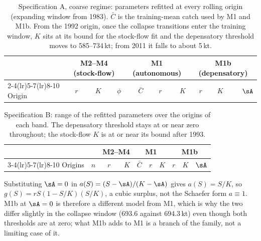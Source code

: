 \begin{table}[!htb]
\centering\scriptsize
\setlength{\tabcolsep}{4pt}
\caption{Specification A, coarse regime: parameters refitted at every rolling origin (expanding window from 1983). $\bar C$ is the training-mean catch used by M1 and M1b. From the 1992 origin, once the collapse transitions enter the training window, $K$ sits at its bound for the stock-flow fit and the depensatory threshold moves to 585--734\,kt; from 2011 it falls to about 5\,kt.}
\label{tab:si_rollingA}
\begin{tabular}{@{}lrrrrrrrrr@{}}
\toprule
 & \multicolumn{3}{c}{M2--M4 (stock-flow)} & \multicolumn{3}{c}{M1 (autonomous)} & \multicolumn{3}{c}{M1b (depensatory)} \\
\cmidrule(lr){2-4}\cmidrule(lr){5-7}\cmidrule(lr){8-10}
Origin & $r$ & $K$ & $\phi$ & $\bar C$ & $r$ & $K$ & $r$ & $K$ & $\sA$ \\
\midrule

\bottomrule
\end{tabular}
\end{table}

\begin{table}[!htb]
\centering\scriptsize
\setlength{\tabcolsep}{4pt}
\caption{Specification B: range of the refitted parameters over the origins of each band. The depensatory threshold stays at or near zero throughout; the stock-flow $K$ is at or near its bound after 1993.}
\label{tab:si_rollingB}
\begin{tabular}{@{}lrrrrrrrrr@{}}
\toprule
 & & \multicolumn{2}{c}{M2--M4} & \multicolumn{3}{c}{M1} & \multicolumn{3}{c}{M1b} \\
\cmidrule(lr){3-4}\cmidrule(lr){5-7}\cmidrule(lr){8-10}
Origins & $n$ & $r$ & $K$ & $\bar C$ & $r$ & $K$ & $r$ & $K$ & $\sA$ \\
\midrule

\bottomrule
\end{tabular}
\end{table}

\begin{remark}
Substituting $\sA = 0$ in $a(S) = (S-\sA)/(K-\sA)$ gives $a(S) = S/K$, so $g(S) = rS(1-S/K)(S/K)$, a cubic surplus, not the Schaefer form $a\equiv 1$. M1b at $\sA = 0$ is therefore a different model from M1, which is why the two differ slightly in the collapse window (693.6 against 694.3\,kt) even though both thresholds are at zero; what M1b adds to M1 is a branch of the family, not a limiting case of it.
\end{remark}

